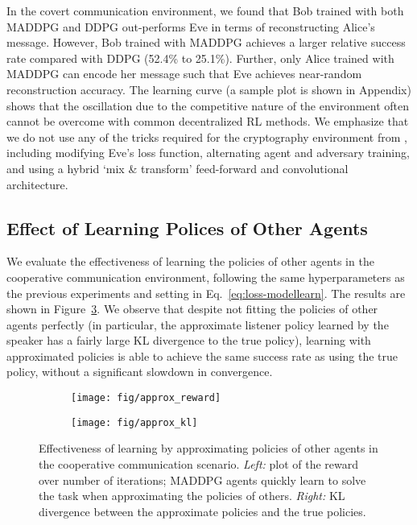 \documentclass{article}
\begin{document}
In the covert communication environment, we found that Bob trained with both MADDPG and DDPG out-performs Eve in terms of reconstructing Alice's message. However, Bob trained with MADDPG achieves a larger relative success rate compared with DDPG (52.4\% to 25.1\%). Further, only Alice trained with MADDPG can encode her message such that Eve achieves near-random reconstruction accuracy. 
The learning curve (a sample plot is shown in Appendix) shows that the oscillation due to the competitive nature of the environment often cannot be overcome with common decentralized RL methods. We emphasize that we do not use any of the tricks required for the cryptography environment from \cite{abadi2016learning}, including modifying Eve's loss function, alternating agent and adversary training, and using a hybrid `mix \& transform' feed-forward and convolutional architecture.









\subsection{Effect of Learning Polices of Other Agents}

We evaluate the effectiveness of learning the policies of other agents in the cooperative communication environment, following the same hyperparameters as the previous experiments and setting  in Eq.~\ref{eq:loss-modellearn}. The results are shown in Figure~\ref{fig:approx}. 
We observe that despite not fitting the policies of other agents perfectly (in particular, the approximate listener policy learned by the speaker has a fairly large KL divergence to the true policy), learning with approximated policies is able to achieve the same success rate as using the true policy, without a significant slowdown in convergence.

\begin{figure}
\begin{subfigure}{.5\textwidth}
  \centering
  \texttt{[image: fig/approx\_reward]}
\label{fig:approx_reward}
\end{subfigure}
\begin{subfigure}{.5\textwidth}
  \centering
  \texttt{[image: fig/approx\_kl]}
\label{fig:approx_kl}
\end{subfigure}
\caption{Effectiveness of learning by approximating policies of other agents in the cooperative communication scenario. \textit{Left:} plot of the reward over number of iterations; MADDPG agents quickly learn to solve the task when approximating the policies of others. \textit{Right:} KL divergence between the approximate policies and the true policies. \vspace{-3mm}}\label{fig:approx}
\end{figure}
\end{document}
